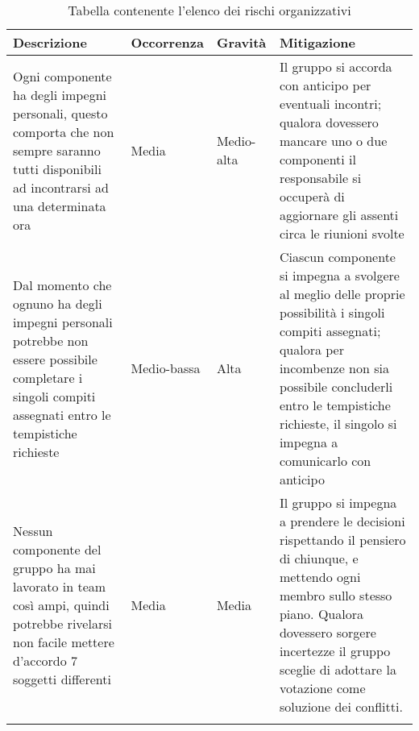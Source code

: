 \documentclass[../piano_di_progetto.tex]{subfiles}
\begin{document}
\begin{center}
	\begin{longtable}{| p{3.5cm} | p{2cm}|p{2cm}|p{3.5cm}|}
		\hline
		\rowcolor{lightgray}
		{\textbf{Descrizione}} & {\textbf{Occorrenza}} & {\textbf{Gravità}} & {\textbf{Mitigazione}} \\

		\hline
			Ogni componente ha degli impegni personali, questo comporta che non sempre saranno tutti disponibili ad incontrarsi ad una determinata ora
			&
			Media
			& 
			Medio-alta
			&
			Il gruppo si accorda con anticipo per eventuali incontri; qualora dovessero mancare uno o due componenti il responsabile si occuperà di aggiornare gli assenti circa le riunioni svolte \\	
			\hline
			Dal momento che ognuno ha degli impegni personali potrebbe non essere possibile completare i singoli compiti assegnati entro le tempistiche richieste
			&
			Medio-bassa
			& 
			Alta
			& 
			Ciascun componente si impegna a svolgere al meglio delle proprie possibilità i singoli compiti assegnati; qualora per incombenze non sia possibile concluderli entro le tempistiche richieste, il singolo si impegna a comunicarlo con anticipo\\
			\hline
			Nessun componente del gruppo ha mai lavorato in team così ampi, quindi potrebbe rivelarsi non facile mettere d’accordo 7 soggetti differenti
			&
			Media
			&
			Media
			&
			Il gruppo si impegna a prendere le decisioni rispettando il pensiero di chiunque, e mettendo ogni membro sullo stesso piano. Qualora dovessero sorgere incertezze il gruppo sceglie di adottare la votazione come soluzione dei conflitti. \\
\hline

\caption{Tabella contenente l'elenco dei rischi organizzativi}
	\end{longtable}

\end{center}
\end{document}
